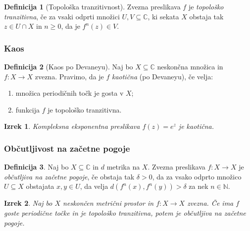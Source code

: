 \documentclass{beamer}
\newcommand{\NN}{\mathbb{N}}
\newcommand{\CC}{\mathbb{C}}
\theoremstyle{definition}
\newtheorem{definicija}{Definicija}
\theoremstyle{plain}
\newtheorem{izrek}{Izrek}
\begin{document}
\begin{frame}

  \begin{definicija}[Topološka tranzitivnost]
    Zvezna preslikava \(f\) je \emph{topološko tranzitivna}, če za vsaki odprti množici \(U, V \subseteq \CC\), ki sekata \(X\) obstaja tak \(z \in U \cap X\) in \(n \geq 0\), da je \(f^n (z) \in V\).
  \end{definicija}

\end{frame}

\begin{frame}
  \frametitle{Kaos}

  \begin{definicija}[Kaos po Devaneyu]
    Naj bo \(X \subseteq \CC\) neskončna množica in \(f \colon X \to X\) zvezna. Pravimo, da je \(f\) \emph{kaotična} (po Devaneyu), če velja:
    \begin{enumerate}
      \item množica periodičnih točk je gosta v \(X\);
      \item funkcija \(f\) je topološko tranzitivna.
    \end{enumerate}
  \end{definicija}
  \pause
  \begin{izrek}
    Kompleksna eksponentna preslikava \(f(z) = e^z\) je kaotična.
  \end{izrek}

\end{frame}

\begin{frame}
  \frametitle{Občutljivost na začetne pogoje}

  \begin{definicija}
    Naj bo \(X \subseteq \CC\) in \(d\) metrika na \(X\). Zvezna preslikava \(f \colon X \to X\) je \emph{občutljiva na začetne pogoje}, če obstaja tak \(\delta > 0\), da za vsako odprto množico \(U \subseteq X\) obstajata \(x, y \in U\), da velja \(d(f^n(x), f^n(y)) > \delta\) za nek \(n \in \NN\).
  \end{definicija}

  \pause

  \begin{izrek}
    Naj bo \(X\) neskončen metrični prostor in \(f \colon X \to X\) zvezna. Če ima \(f\) goste periodične točke in je topološko tranzitivna, potem je občutljiva na začetne pogoje.
  \end{izrek}

\end{frame}
\end{document}
